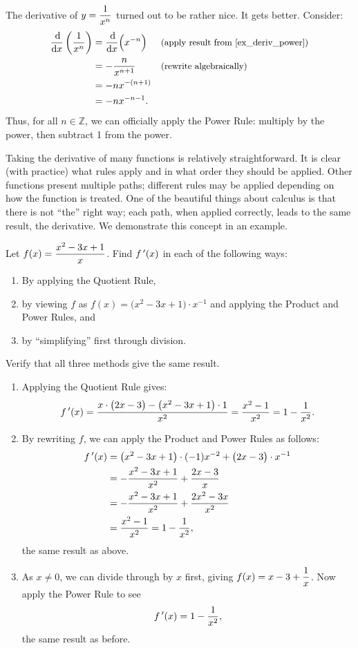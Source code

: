 The derivative of $\displaystyle y=\frac{1}{x^n}$ turned out to be rather nice. It gets better. Consider:
\begin{align*}
	\frac{\dd}{\dd x}\left(\frac{1}{x^n}\right)
	&= \frac{\dd}{\dd x}\Bigl(x^{-n}\Bigr) &&
	\text{\small (apply result from \autoref{ex_deriv_power})}\\
	&= -\frac{n}{x^{n+1}} && \text{\small (rewrite algebraically)} \\
	&= -nx^{-(n+1)} \\
	&= -nx^{-n-1}.
\end{align*}
Thus, for all $n\in\mathbb{Z}$, we can officially apply the Power Rule: multiply by the power, then subtract 1 from the power.

Taking the derivative of many functions is relatively straightforward. It is clear (with practice) what rules apply and in what order they should be applied. Other functions present multiple paths; different rules may be applied depending on how the function is treated. One of the beautiful things about calculus is that there is not ``the'' right way; each path, when applied correctly, leads to the same result, the derivative. We demonstrate this concept in an example.

\begin{example}\label{ex_multiple_deriv}%
Let $\displaystyle f(x) = \frac{x^2-3x+1}{x}$. Find $f\,'(x)$ in each of the following ways:
\begin{enumerate}
	\item	By applying the Quotient Rule,
	\item	by viewing $f$ as $f(x) = \bigl(x^2-3x+1\bigr)\cdot x^{-1}$ and applying the Product and Power Rules, and
	\item	by ``simplifying\primeskip'' first through division.
\end{enumerate}
Verify that all three methods give the same result.
\solution
\begin{enumerate}
	\item	Applying the Quotient Rule gives:
	\[f\,'(x) = \frac{x\cdot\bigl(2x-3\bigr)-\bigl(x^2-3x+1\bigr)\cdot 1}{x^2} = \frac{x^2-1}{x^2} = 1-\frac{1}{x^2}.\]
	\item	By rewriting $f$, we can apply the Product and Power Rules as follows:
	\begin{align*}
		f\,'(x)
		&= \bigl(x^2-3x+1\bigr)\cdot (-1)x^{-2} + \bigl(2x-3\bigr)\cdot x^{-1} \\
		&= -\frac{x^2-3x+1}{x^2}+\frac{2x-3}{x} \\
		&= -\frac{x^2-3x+1}{x^2}+\frac{2x^2-3x}{x^2}\\
		&= \frac{x^2-1}{x^2} = 1-\frac{1}{x^2},
	\end{align*}
	the same result as above.
	\item	As $x\neq 0$, we can divide through by $x$ first, giving $\displaystyle f(x) = x-3+\frac{1}x$. Now apply the Power Rule to see
	\[f\,'(x) = 1-\frac{1}{x^2},\]
	the same result as before.
\end{enumerate}
\end{example}


